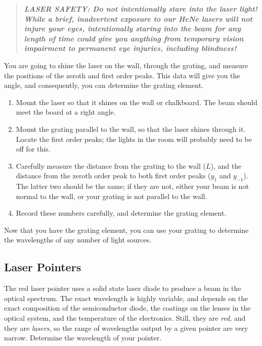 \documentclass[12pt]{article}
\begin{document}
\begin{quote}
  \textbf{\textit{LASER SAFETY: Do not intentionally stare into the
      laser light! While a brief, inadvertent exposure to our HeNe
      lasers will not injure your eyes, intentionally staring into the
      beam for any length of time could give you anything from
      temporary vision impairment to permanent eye injuries, including
      blindness!}}
\end{quote}

You are going to shine the laser on the wall, through the grating, and
measure the positions of the zeroth and first order peaks.  This data
will give you the angle, and consequently, you can determine the
grating element.
\begin{enumerate}
\item Mount the laser so that it shines on the wall or chalkboard.
  The beam should meet the board at a right angle.
\item Mount the grating parallel to the wall, so that the laser shines
  through it.  Locate the first order peaks; the lights in the room
  will probably need to be off for this.
\item Carefully measure the distance from the grating to the wall
  ($L$), and the distance from the zeroth order peak to both first
  order peaks ($y_1$ and $y_{-1}$).  The latter two should be the
  same; if they are not, either your beam is not normal to the wall,
  or your grating is not parallel to the wall.  
\item Record these numbers carefully, and determine the grating
  element. 
\end{enumerate}

Now that you have the grating element, you can use your grating to
determine the wavelengths of any number of light sources.

\subsection{Laser Pointers}
\label{sec:pointers}

The red laser pointer uses a solid state laser diode to produce a beam
in the optical spectrum.  The exact wavelength is highly variable, and
depends on the exact composition of the semiconductor diode, the
coatings on the lenses in the optical system, and the temperature of
the electronics.  Still, they are \textit{red}, and they are
\textit{lasers}, so the range of wavelengths output by a given pointer
are very narrow.  Determine the wavelength of your pointer.
\end{document}
